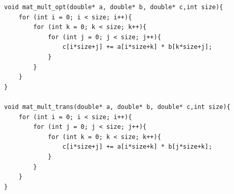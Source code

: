 \documentclass[a4paper,11pt]{scrartcl}
\begin{document}
\begin{verbatim}
void mat_mult_opt(double* a, double* b, double* c,int size){
    for (int i = 0; i < size; i++){
        for (int k = 0; k < size; k++){
            for (int j = 0; j < size; j++){
                c[i*size+j] += a[i*size+k] * b[k*size+j];
            }
        }
    }
}

void mat_mult_trans(double* a, double* b, double* c,int size){
    for (int i = 0; i < size; i++){
        for (int j = 0; j < size; j++){
            for (int k = 0; k < size; k++){
                c[i*size+j] += a[i*size+k] * b[j*size+k];
            }
        }
    }
}
\end{verbatim}
\end{document}
